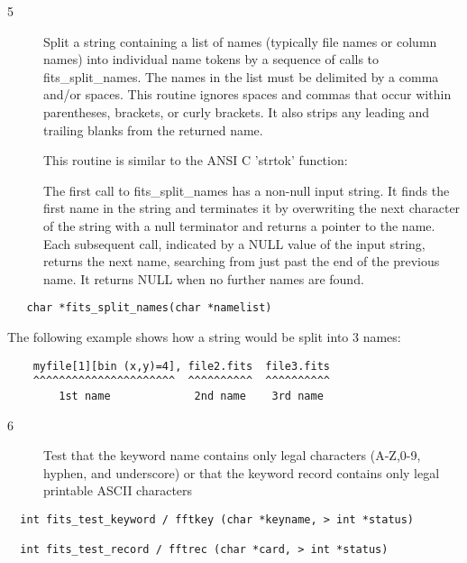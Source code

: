 \documentclass[11pt]{book}
\begin{document}
\begin{description}
\item[5 ]Split a string containing a list of names (typically file names or column
   names) into individual name tokens by a sequence of calls to
   fits\_split\_names.  The names in the list must be delimited by a comma
   and/or spaces.  This routine ignores spaces and commas that occur
   within parentheses, brackets, or curly brackets.  It also strips any
   leading and trailing blanks from the returned name.

   This routine is similar to the ANSI C 'strtok' function:

   The first call to fits\_split\_names has a non-null input string.
   It finds the first name in the string and terminates it by overwriting
   the next character of the string with a null terminator and returns a
   pointer to the name.  Each subsequent call, indicated by a NULL value
   of the input string, returns the next name, searching from just past
   the end of the previous name.  It returns NULL when no further names
  are found.  \label{splitnames}
\end{description}

\begin{verbatim}
   char *fits_split_names(char *namelist)
\end{verbatim}
   The following example shows how a string would be split into 3 names:

\begin{verbatim}
    myfile[1][bin (x,y)=4], file2.fits  file3.fits
    ^^^^^^^^^^^^^^^^^^^^^^  ^^^^^^^^^^  ^^^^^^^^^^
        1st name             2nd name    3rd name
\end{verbatim}

\begin{description}
\item[6 ] Test that the keyword name contains only legal characters (A-Z,0-9,
    hyphen, and underscore) or that the keyword record contains only legal
   printable ASCII characters  \label{fftkey} \label{fftrec}
\end{description}

\begin{verbatim}
  int fits_test_keyword / fftkey (char *keyname, > int *status)

  int fits_test_record / fftrec (char *card, > int *status)
\end{verbatim}
\end{document}
